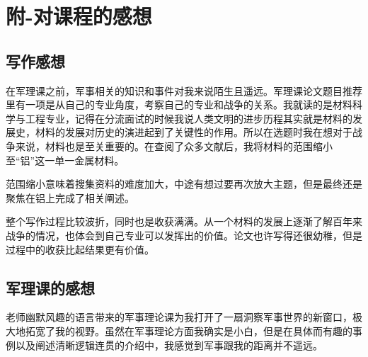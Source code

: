 \documentclass{source/Paper}
\begin{document}


\newpage
\appendix
\section{附-对课程的感想}
\subsection{写作感想}
在军理课之前，军事相关的知识和事件对我来说陌生且遥远。军理课论文题目推荐里有一项是从自己的专业角度，考察自己的专业和战争的关系。我就读的是材料科学与工程专业，记得在分流面试的时候我说人类文明的进步历程其实就是材料的发展史，材料的发展对历史的演进起到了关键性的作用。所以在选题时我在想对于战争来说，材料也是至关重要的。在查阅了众多文献后，我将材料的范围缩小至“铝”这一单一金属材料。

范围缩小意味着搜集资料的难度加大，中途有想过要再次放大主题，但是最终还是聚焦在铝上完成了相关阐述。

整个写作过程比较波折，同时也是收获满满。从一个材料的发展上逐渐了解百年来战争的情况，也体会到自己专业可以发挥出的价值。论文也许写得还很幼稚，但是过程中的收获比起结果更有价值。
\subsection{军理课的感想}
老师幽默风趣的语言带来的军事理论课为我打开了一扇洞察军事世界的新窗口，极大地拓宽了我的视野。虽然在军事理论方面我确实是小白，但是在具体而有趣的事例以及阐述清晰逻辑连贯的介绍中，我感觉到军事跟我的距离并不遥远。
\end{document}
